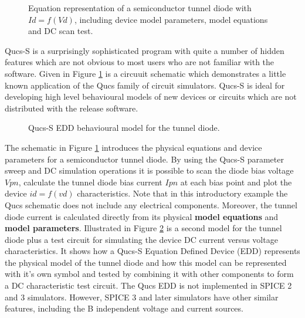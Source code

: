 \begin{figure}[h]
	\centering
	\caption{Equation representation of a semiconductor tunnel diode with $Id = f(Vd)$, including device model parameters, model equations and DC scan test. }
	\label{FigCH1-2}
\end{figure}

\noindent Qucs-S is a surprisingly sophisticated program with quite a number of hidden features which are not obvious to most users who are not familiar with the software. Given in Figure \ref{FigCH1-2} is a circuuit schematic which demonstrates a little known application of the Qucs family of circuit simulators. Qucs-S is ideal for developing high level behavioural models of new devices or circuits which are not distributed with the release software.
\begin{figure}[ht]
	\centering
	\caption{Qucs-S EDD behavioural model for the tunnel diode. }
	\label{FigCH1-3}
\end{figure}
 The schematic in Figure \ref{FigCH1-2} introduces the physical equations and device parameters for a semiconductor tunnel diode. By using the Qucs-S parameter sweep and DC simulation operations it is possible to scan the diode bias voltage $Vpn$, calculate the tunnel diode bias current $Ipn$ at each bias point and plot the device $id = f(vd)$ characteristics. Note that in this introductory example the Qucs schematic does not include any electrical components. Moreover, the tunnel diode current is calculated directly from its physical \textbf{model equations} and \textbf{model parameters}.
Illustrated in Figure \ref{FigCH1-3} is a second model for the tunnel diode plus a test circuit for simulating the device DC current versus voltage characteristics.   It shows how a Qucs-S Equation Defined Device (EDD) represents the physical model of the tunnel diode and how this model can be represented with it's own symbol and tested by combining it with other components to form a DC characteristic test circuit. The Qucs EDD is not implemented in SPICE 2 and 3 simulators. However, SPICE 3 and later simulators have other similar features, including the B independent voltage and current sources.

